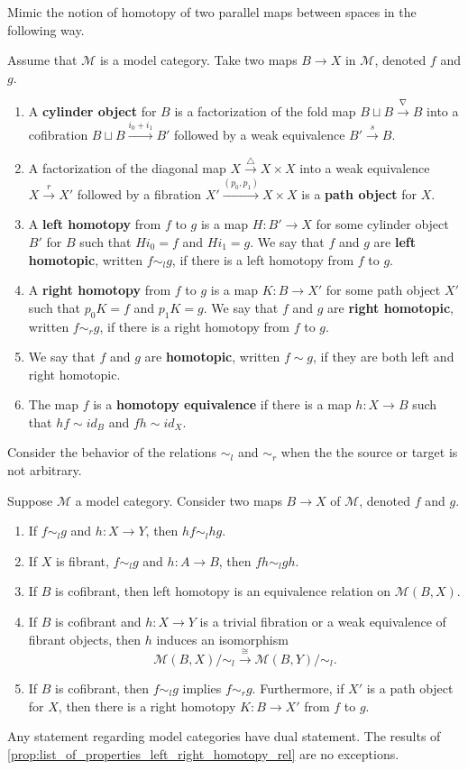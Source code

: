 Mimic the notion of homotopy of two parallel maps between spaces in the following way.
\begin{definition}
Assume that $\mathscr{M}$ is a model category. Take two maps $B\to X$ in $\mathscr{M}$, denoted $f$ and $g$.
\begin{enumerate}
\item{A \textbf{cylinder object} for $B$ is a factorization of the fold map $B\sqcup B\xrightarrow{\nabla } B$ into a cofibration $B\sqcup B\xrightarrow{i_0+i_1} B'$ followed by a weak equivalence $B'\xrightarrow{s} B$.}
\item{A factorization of the diagonal map $X\xrightarrow{\triangle } X\times X$ into a weak equivalence $X\xrightarrow{r} X'$ followed by a fibration $X'\xrightarrow{(p_0,p_1)} X\times X$ is a \textbf{path object} for $X$.}
\item{A \textbf{left homotopy} from $f$ to $g$ is a map $H:B'\to X$ for some cylinder object $B'$ for $B$ such that $Hi_0=f$ and $Hi_1=g$. We say that $f$ and $g$ are \textbf{left homotopic}, written $f\sim _lg$, if there is a left homotopy from $f$ to $g$.}
\item{A \textbf{right homotopy} from $f$ to $g$ is a map $K:B\to X'$ for some path object $X'$ such that $p_0K=f$ and $p_1K=g$. We say that $f$ and $g$ are \textbf{right homotopic}, written $f\sim _rg$, if there is a right homotopy from $f$ to $g$.}
\item{We say that $f$ and $g$ are \textbf{homotopic}, written $f\sim g$, if they are both left and right homotopic.}
\item{The map $f$ is a \textbf{homotopy equivalence} if there is a map $h:X\to B$ such that $hf\sim id_B$ and $fh\sim id_X$.}
\end{enumerate}
\end{definition}
\noindent Consider the behavior of the relations $\sim _l$ and $\sim _r$ when the the source or target is not arbitrary.
\begin{proposition}\label{prop:list_of_properties_left_right_homotopy_rel}
Suppose $\mathscr{M}$ a model category. Consider two maps $B\to X$ of $\mathscr{M}$, denoted $f$ and $g$.
\begin{enumerate}
\item{If $f\sim _lg$ and $h:X\to Y$, then $hf\sim _lhg$.}
\item{If $X$ is fibrant, $f\sim _lg$ and $h:A\to B$, then $fh\sim _lgh$.}
\item{If $B$ is cofibrant, then left homotopy is an equivalence relation on $\mathscr{M} (B,X)$.}
\item{If $B$ is cofibrant and $h:X\to Y$ is a trivial fibration or a weak equivalence of fibrant objects, then $h$ induces an isomorphism
\[\mathscr{M} (B,X)/\sim _l\xrightarrow{\cong } \mathscr{M} (B,Y)/\sim _l.\]
}
\item{If $B$ is cofibrant, then $f\sim _lg$ implies $f\sim _rg$. Furthermore, if $X'$ is a path object for $X$, then there is a right homotopy $K:B\to X'$ from $f$ to $g$.}
\end{enumerate}
\end{proposition}
\noindent Any statement regarding model categories have dual statement. The results of \cref{prop:list_of_properties_left_right_homotopy_rel} are no exceptions.


